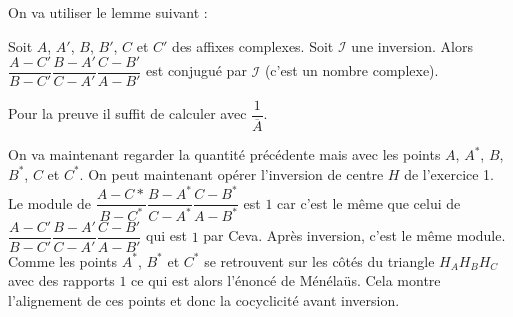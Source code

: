 \begin{sol}

On va utiliser le lemme suivant :

\begin{lem}
Soit $A$, $A'$, $B$, $B'$, $C$ et $C'$ des affixes complexes. Soit $\mathcal{I}$ une inversion. Alors $\dfrac{A-C'}{B-C'}\dfrac{B-A'}{C-A'}\dfrac{C-B'}{A-B'}$ est conjugué par $\mathcal{I}$ (c'est un nombre complexe).
\end{lem}

\begin{preuve}
Pour la preuve il suffit de calculer avec $\dfrac{1}{\overline{A}}$.
\end{preuve}

On va maintenant regarder la quantité précédente mais avec les points $A$, $A^*$, $B$, $B^*$, $C$ et $C^*$. On peut maintenant opérer l'inversion de centre $H$ de l'exercice 1. Le module de $\dfrac{A-C*}{B-C^*}\dfrac{B-A^*}{C-A^*}\dfrac{C-B^*}{A-B^*}$ est $1$ car c'est le même que celui de $\dfrac{A-C'}{B-C'}\dfrac{B-A'}{C-A'}\dfrac{C-B'}{A-B'}$ qui est $1$ par Ceva. Après inversion, c'est le même module. Comme les points $A^*$, $B^*$ et $C^*$ se retrouvent sur les côtés du triangle $H_AH_BH_C$ avec des rapports $1$ ce qui est alors l'énoncé de Ménélaüs. Cela montre l'alignement de ces points et donc la cocyclicité avant inversion.
\end{sol}

